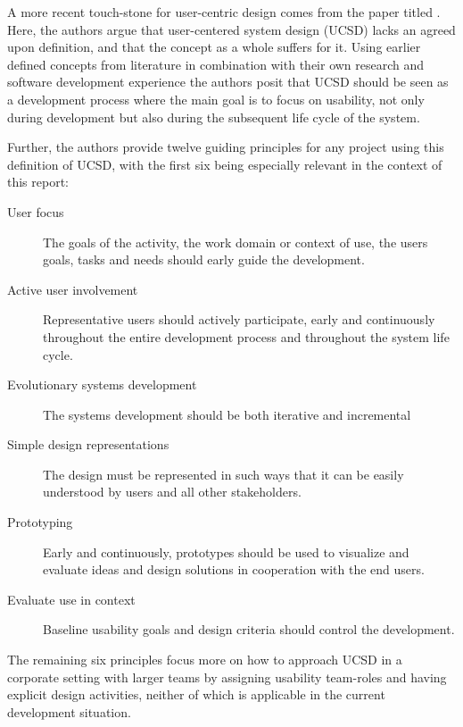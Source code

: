A more recent touch-stone for user-centric design comes from the
\citeyear{citeKeyPrinciplesUserCentric} paper titled
\cite{citeKeyPrinciplesUserCentric}.
Here, the authors argue that user-centered system design (UCSD) lacks an agreed
upon definition, and that the concept as a whole suffers for it. Using earlier
defined concepts from literature in combination with their own research and
software development experience the authors posit that UCSD should be seen as a
development process where the main goal is to focus on usability, not only
during development but also during the subsequent life cycle of the system.

Further, the authors provide twelve guiding
principles\cite[p. 401]{citeKeyPrinciplesUserCentric}
for any project using this definition of UCSD, with the first six being
especially relevant in the context of this report:


\begin{description}
  \item[User focus]{%
    The goals of the activity, the work domain or
    context of use, the users goals, tasks and  needs should early guide
    the development.%
  }
  \item[Active user involvement]{%
    Representative users should actively
    participate, early and continuously throughout the entire development
    process and throughout the system life cycle.%
  }
  \item[Evolutionary systems development]{The systems development should be
  both iterative and incremental%
  }
  \item[Simple design representations]{%
    The design must be represented in
    such ways that it can be easily understood by users and all other
    stakeholders.%
  }
  \item[Prototyping]{%
    Early and continuously, prototypes should be used to
    visualize and evaluate ideas and design solutions in cooperation with
    the end users.%
  }
  \item[Evaluate use in context]{%
    Baseline usability goals and design
    criteria should control the development.%
  }
\end{description}

The remaining six principles focus more on how to approach UCSD in a
corporate setting with larger teams by assigning usability team-roles and
having explicit design activities, neither of which is applicable in the
current development situation.

